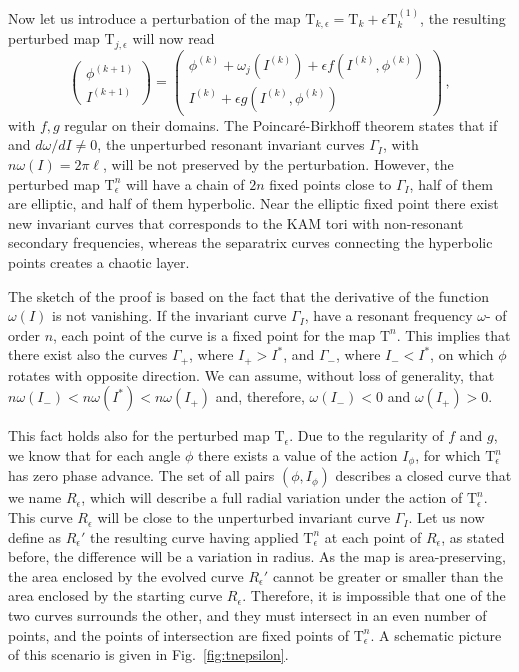Now let us introduce a perturbation of the map $\mathrm{T}_{k,\epsilon} = \mathrm{T}_k + \epsilon \mathrm{T}^{(1)}_k$, the resulting perturbed map $\mathrm{T}_{j,\epsilon}$ will now read
\begingroup
\renewcommand*{\arraystretch}{1.5}
\begin{equation}
	\begin{pmatrix} \phi^{(k+1)} \\ I^{(k+1)} \end{pmatrix}  = \begin{pmatrix} \phi^{(k)} + \omega_j\left(I^{(k)}\right) + \epsilon f(I^{(k)}, \phi^{(k)}) \\ I^{(k)}  + \epsilon g(I^{(k)}, \phi^{(k)}) \end{pmatrix} \, ,
    \label{eq:area_perturbed_map}
\end{equation}
\endgroup
with $f, g$ regular on their domains. The Poincaré-Birkhoff theorem states that if and $d\omega/dI\ne 0$, the unperturbed resonant invariant curves $\Gamma_I$, with $n\omega(I)=2\pi \ell$, will be not preserved by the perturbation. However, the perturbed map $\mathrm{T}^n_{\epsilon}$ will have a chain of $2n$ fixed points close to $\Gamma_I$, half of them are elliptic, and half of them hyperbolic. Near the elliptic fixed point there exist new invariant curves that corresponds to the KAM tori with non-resonant secondary frequencies, whereas the separatrix curves connecting the hyperbolic points creates a chaotic layer.

The sketch of the proof is based on the fact that the derivative of the function $\omega(I)$ is not vanishing.  If the invariant curve $\Gamma_{I}$, have a resonant frequency $\omega$- of order $n$, each point of the curve is a fixed point for the map $\mathrm{T}^n$. This implies that there exist also the curves $\Gamma_+$, where $I_+>I^*$, and $\Gamma_-$, where $I_-<I^*$, on which $\phi$ rotates with opposite direction. We can assume, without loss of generality, that $n\omega(I_-)<n\omega(I^*)<n\omega(I_+)$ and, therefore, $\omega(I_-)<0$ and $\omega(I_+)>0$.

This fact holds also for the perturbed map $\mathrm{T}_\epsilon$. Due to the regularity of $f$ and $g$, we know that for each angle $\phi$ there exists a value of the action $I_\phi$, for which $\mathrm{T}^n_\epsilon$ has zero phase advance. The set of all pairs $(\phi, I_\phi)$ describes a closed curve that we name $R_\epsilon$, which will describe a full radial variation under the action of $\mathrm{T}^n_\epsilon$. This curve $R_\epsilon$ will be close to the unperturbed invariant curve $\Gamma_I$. Let us now define as $R_\epsilon'$ the resulting curve having applied $\mathrm{T}^n_\epsilon$ at each point of $R_\epsilon$, as stated before, the difference will be a variation in radius. As the map is area-preserving, the area enclosed by the evolved curve $R_\epsilon'$ cannot be greater or smaller than the area enclosed by the starting curve $R_\epsilon$. Therefore, it is impossible that one of the two curves surrounds the other, and they must intersect in an even number of points, and the points of intersection are fixed points of $\mathrm{T}^n_\epsilon$. A schematic picture of this scenario is given in Fig.~\ref{fig:tnepsilon}.

